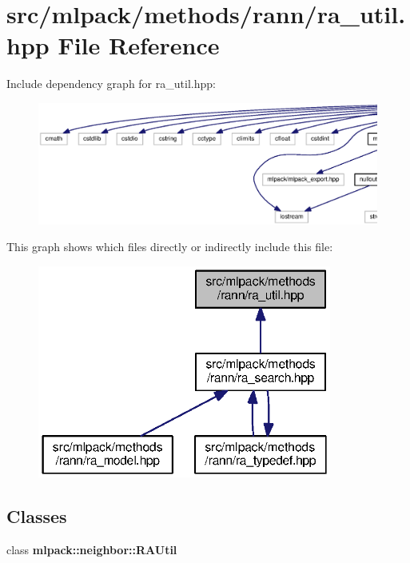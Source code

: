 \section{src/mlpack/methods/rann/ra\+\_\+util.hpp File Reference}
\label{ra__util_8hpp}
Include dependency graph for ra\+\_\+util.\+hpp\+:
\nopagebreak
\begin{figure}[H]
\begin{center}
\leavevmode
\includegraphics[width=350pt]{ra__util_8hpp__incl}
\end{center}
\end{figure}
This graph shows which files directly or indirectly include this file\+:
\nopagebreak
\begin{figure}[H]
\begin{center}
\leavevmode
\includegraphics[width=274pt]{ra__util_8hpp__dep__incl}
\end{center}
\end{figure}
\subsection*{Classes}
\begin{DoxyCompactItemize}
\item 
class {\bf mlpack\+::neighbor\+::\+R\+A\+Util}
\end{DoxyCompactItemize}
